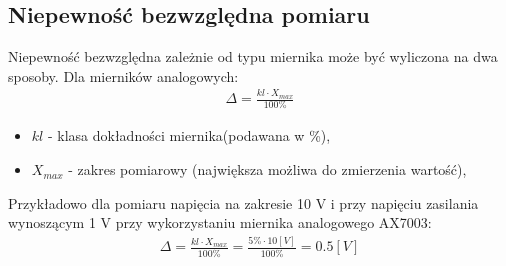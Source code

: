 \documentclass[11pt]{article}
\begin{document}
    \subsection*{Niepewność bezwzględna pomiaru}
    \par{
    Niepewność bezwzględna zależnie od typu miernika może być wyliczona na dwa sposoby. Dla mierników analogowych:
    }
    \begin{gather}
        \Delta=\frac{kl\cdot X_{max}}{100\%}
    \end{gather}
    {\footnotesize
        \begin{itemize}
              \setlength\itemsep{0em}
              \item[] \boldmath$kl$ - klasa dokładności miernika(podawana w \%),
              \item[] \boldmath$X_{max}$ - zakres pomiarowy (największa możliwa do zmierzenia wartość),
        \end{itemize}}
    \par{\noindent
    Przykładowo dla pomiaru napięcia na zakresie 10 V i przy napięciu zasilania wynoszącym 1 V przy wykorzystaniu miernika analogowego AX7003:
    }
    \begin{gather}
        \Delta=\frac{kl\cdot X_{max}}{100\%}=\frac{5\%\cdot 10[V]}{100\%}=0.5[V]
    \end{gather}
\end{document}

